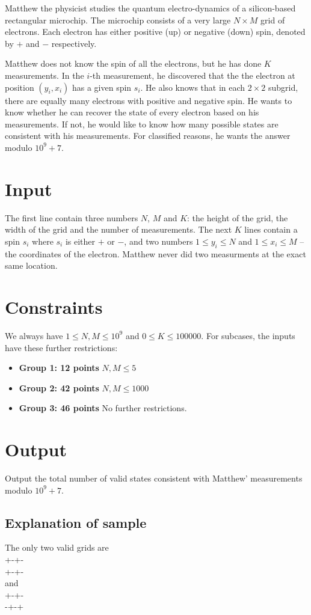 
Matthew the physicist studies the quantum electro-dynamics of a silicon-based rectangular microchip. The microchip consists of a very large $N \times M$ grid of electrons. Each electron has either positive (up) or negative (down) spin, denoted by $+$ and $-$ respectively.

Matthew does not know the spin of all the electrons, but he has done $K$ measurements. In the $i$-th measurement, he discovered that the the electron at position $(y_i, x_i)$ has a given spin $s_i$. He also knows that in each $2\times2$ subgrid, there are equally many electrons with positive and negative spin. He wants to know whether he can recover the state of every electron based on his measurements. If not, he would like to know how many possible states are consistent with his measurements. For classified reasons, he wants the answer modulo $10 ^ 9 + 7$.

\section*{Input}
The first line contain three numbers $N$, $M$ and $K$: the height of the grid, the width of the grid and the number of measurements. The next $K$ lines contain a spin $s_i$ where $s_i$ is either $+$ or $-$, and two numbers $1 \leq y_i \leq N$ and $1 \leq x_i \leq M$ -- the coordinates of the electron. Matthew never did two measurments at the exact same location.

\section*{Constraints}
We always have $1 \leq N, M \leq 10^9$ and $0 \leq K \leq 100000$. For subcases, the inputs have these further restrictions:
\begin{itemize}
\item{\textbf{Group 1: 12 points}} $N, M \leq 5$
\item{\textbf{Group 2: 42 points}} $N, M \leq 1000$
\item{\textbf{Group 3: 46 points}} No further restrictions.
\end{itemize}

\section*{Output}
Output the total number of valid states consistent with Matthew' measurements modulo $10 ^ 9 + 7$.

\subsection*{Explanation of sample}
The only two valid grids are\\
+-+- \\
+-+- \\
and \\
+-+- \\
-+-+ \\
